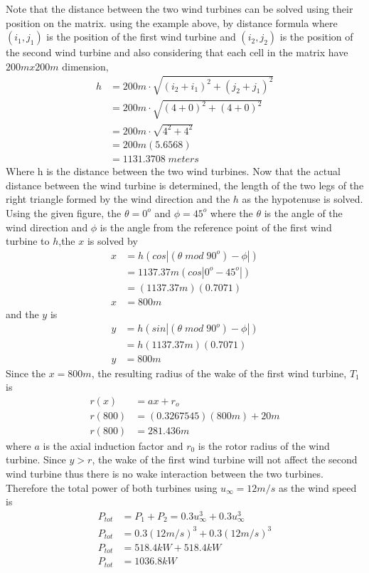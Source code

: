 Note that the distance between the two wind turbines can be solved using their position on the matrix. using the example above, by distance formula where $(i_{1},j_{1})$ is the position of the first wind turbine and $(i_{2},j_{2})$ is the position of the second wind turbine and also considering that each cell in the matrix have $200mx200m$ dimension,
    \begin{align*}
        h &= 200m\cdot \sqrt{(i_{2}+i_{1})^{2}+(j_{2}+j_{1})^{2}}\\
         &= 200m\cdot \sqrt{(4+0)^{2}+(4+0)^{2}} \\
         &= 200m\cdot \sqrt{4^{2}+4^{2}} \\
         &= 200m(5.6568) \\
         &= 1131.3708\;meters
    \end{align*}
Where h is the distance between the two wind turbines. Now that the actual distance between the wind turbine is determined, the length of the two legs of the right triangle formed by the wind direction and the $h$ as the hypotenuse is solved. Using the given figure, the $\theta=0^{o}$ and $\phi=45^{o}$ where the $\theta$ is the angle of the wind direction and $\phi$ is the angle from the reference point of the first wind turbine to $h$,the $x$ is solved by
    \begin{align*}
        x &= h(cos|(\theta\;mod\;90^{o})-\phi|) \\
          &= 1137.37m(cos|0^{o}-45^{o}|) \\
          &= (1137.37m)(0.7071) \\
        x &= 800m
    \end{align*}
and the $y$ is
    \begin{align*}
        y &= h(sin|(\theta\;mod\;90^{o})-\phi|) \\
          &= h(1137.37m)(0.7071) \\
        y  &= 800m
    \end{align*}
Since the $x=800m$, the resulting radius of the wake of the first wind turbine, $T_{1}$ is
    \begin{align*}
        r(x)   &= ax + r_{o} \\
        r(800) &= (0.3267545)(800m) + 20m \\
        r(800) &= 281.436m
    \end{align*}
where $a$ is the axial induction factor and $r_{0}$ is the rotor radius of the wind turbine. Since $y>r$, the wake of the first wind turbine will not affect the second wind turbine thus there is no wake interaction between the two turbines. Therefore the total power of both turbines using $u_{\infty}=12m/s$ as the wind speed is
    \begin{align*}
        P_{tot} &= P_{1} + P_{2} = 0.3u_{\infty}^{3} + 0.3u_{\infty}^{3} \\
        P_{tot} &= 0.3(12m/s)^{3} + 0.3(12m/s)^{3} \\
        P_{tot} &= 518.4kW + 518.4kW\\
        P_{tot} &= 1036.8kW
    \end{align*}
    
